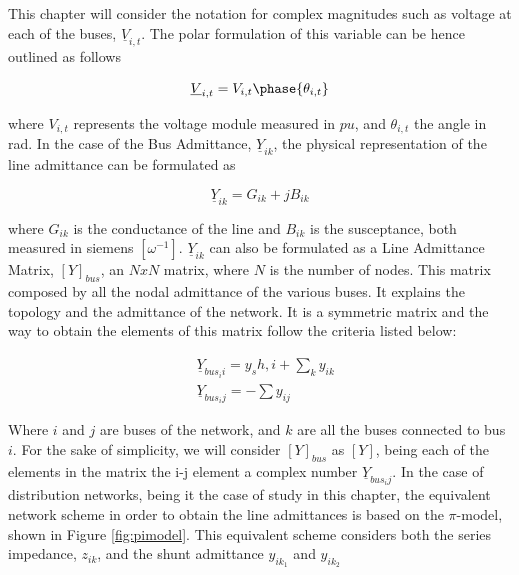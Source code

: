 This chapter will consider the notation for complex magnitudes such as voltage at each of the buses, $\underline{V}_{i,t}$. The polar formulation of this variable can be hence outlined as follows

\begin{equation}
\underline{V}_{i,t} = V_{i,t} \phase{\theta_{i,t}}
\end{equation}

where $V_{i,t}$ represents the voltage module measured in $pu$, and $\theta_{i,t}$ the angle in rad. In the case of the Bus Admittance, $\underline{Y}_{ik}$, the physical representation of the line admittance can be formulated as

\begin{equation}
\underline{Y}_{ik} = G_{ik} + jB_{ik}
\end{equation}

where $G_{ik}$ is the conductance of the line and $B_{ik}$ is the susceptance, both measured in siemens $[\omega^{-1}]$. $\underline{Y}_{ik}$ can also be formulated as a Line Admittance Matrix, $[Y]_{bus}$, an $N x N$ matrix, where $N$ is the number of nodes. This matrix composed by all the nodal admittance of the various buses. It explains the topology and the admittance of the network. It is a symmetric matrix and the way to obtain the elements of this matrix follow the criteria listed below:

\begin{subequations}
\begin{align*}
& \underline{Y}_{bus_ii}= y_sh,i + \sum_k y_{ik} \\
& \underline{Y}_{bus_ij} = - \sum y_{ij}
\end{align*}
\end{subequations}

Where $i$ and $j$ are buses of the network, and $k$ are all the buses connected to bus $i$. For the sake of simplicity, we will consider $[Y]_{bus}$ as $[Y]$, being each of the elements in the matrix the i-j element a complex number $\underline{Y}_{bus_ij}$. In the case of distribution networks, being it the case of study in this chapter, the equivalent network scheme in order to obtain the line admittances is based on the $\pi$-model, shown in Figure \ref{fig:pimodel}. This equivalent scheme considers both the series impedance, $z_{ik}$, and the shunt admittance $y_{ik_1}$ and $y_{ik_2}$ 

